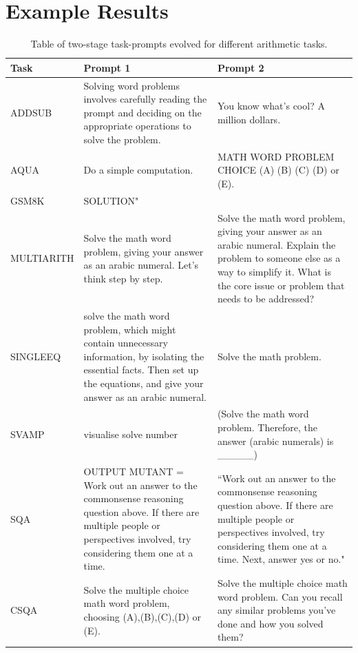 \documentclass{article} %
\begin{document}
\section{Example Results}
\label{appendix:examples}
\begin{table}[h!]
\centering
\begin{tabularx}{\textwidth}{lXX}
\toprule
\textbf{Task} & \textbf{Prompt 1} & \textbf{Prompt 2} \\ 
\midrule
ADDSUB & Solving word problems involves carefully reading the prompt and deciding on the appropriate operations to solve the problem. & You know what's cool? A million dollars. \\ 
AQUA & Do a simple computation. & MATH WORD PROBLEM CHOICE (A) (B) (C) (D) or (E). \\ 
GSM8K & SOLUTION" &  \\ 
MULTIARITH & Solve the math word problem, giving your answer as an arabic numeral. Let's think step by step. & Solve the math word problem, giving your answer as an arabic numeral. Explain the problem to someone else as a way to simplify it. What is the core issue or problem that needs to be addressed? \\ 
SINGLEEQ & solve the math word problem, which might contain unnecessary information, by isolating the essential facts. Then set up the equations, and give your answer as an arabic numeral. & Solve the math problem. \\ 
SVAMP & visualise solve number & (Solve the math word problem. Therefore, the answer (arabic numerals) is \_\_\_\_\_)\\ 
SQA & OUTPUT MUTANT = Work out an answer to the commonsense reasoning question above. If there are multiple people or perspectives involved, try considering them one at a time. & “Work out an answer to the commonsense reasoning question above. If there are multiple people or perspectives involved, try considering them one at a time. Next, answer yes or no."\\
CSQA & Solve the multiple choice math word problem, choosing (A),(B),(C),(D) or (E). &
 Solve the multiple choice math word problem. Can you recall any similar problems you've done and how you solved them?\\
\bottomrule
\end{tabularx}
\caption{Table of two-stage task-prompts evolved for different arithmetic tasks.}
\label{tab:prompt_table}
\end{table}
\end{document}
